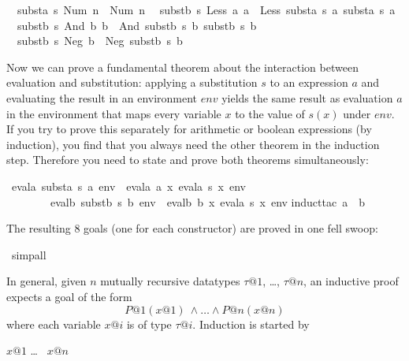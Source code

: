 \begin{isabellebody}
\ \ {\isachardoublequote}substa\ s\ {\isacharparenleft}Num\ n{\isacharparenright}\ {\isacharequal}\ Num\ n{\isachardoublequote}\isanewline
\isanewline
\ \ {\isachardoublequote}substb\ s\ {\isacharparenleft}Less\ a{}\ a{}{\isacharparenright}\ {\isacharequal}\ Less\ {\isacharparenleft}substa\ s\ a{}{\isacharparenright}\ {\isacharparenleft}substa\ s\ a{}{\isacharparenright}{\isachardoublequote}\isanewline
\ \ {\isachardoublequote}substb\ s\ {\isacharparenleft}And\ b{}\ b{}{\isacharparenright}\ {\isacharequal}\ And\ {\isacharparenleft}substb\ s\ b{}{\isacharparenright}\ {\isacharparenleft}substb\ s\ b{}{\isacharparenright}{\isachardoublequote}\isanewline
\ \ {\isachardoublequote}substb\ s\ {\isacharparenleft}Neg\ b{\isacharparenright}\ {\isacharequal}\ Neg\ {\isacharparenleft}substb\ s\ b{\isacharparenright}{\isachardoublequote}\isamarkupfalse%
%
\begin{isamarkuptext}%
Now we can prove a fundamental theorem about the interaction between
evaluation and substitution: applying a substitution $s$ to an expression $a$
and evaluating the result in an environment $env$ yields the same result as
evaluation $a$ in the environment that maps every variable $x$ to the value
of $s(x)$ under $env$. If you try to prove this separately for arithmetic or
boolean expressions (by induction), you find that you always need the other
theorem in the induction step. Therefore you need to state and prove both
theorems simultaneously:%
\end{isamarkuptext}%
\isamarkuptrue%
\ {\isachardoublequote}evala\ {\isacharparenleft}substa\ s\ a{\isacharparenright}\ env\ {\isacharequal}\ evala\ a\ {\isacharparenleft}{\isasymlambda}x{\isachardot}\ evala\ {\isacharparenleft}s\ x{\isacharparenright}\ env{\isacharparenright}\ {\isasymand}\isanewline
\ \ \ \ \ \ \ \ evalb\ {\isacharparenleft}substb\ s\ b{\isacharparenright}\ env\ {\isacharequal}\ evalb\ b\ {\isacharparenleft}{\isasymlambda}x{\isachardot}\ evala\ {\isacharparenleft}s\ x{\isacharparenright}\ env{\isacharparenright}{\isachardoublequote}\isanewline
\isamarkupfalse%
induct{\isacharunderscore}tac\ a\ \ b{\isacharparenright}\isamarkupfalse%
%
\begin{isamarkuptxt}%
\noindent
The resulting 8 goals (one for each constructor) are proved in one fell swoop:%
\end{isamarkuptxt}%
\isamarkuptrue%
\ simp{\isacharunderscore}all\isamarkupfalse%
\isamarkupfalse%
%
\begin{isamarkuptext}%
In general, given $n$ mutually recursive datatypes $\tau@1$, \dots, $\tau@n$,
an inductive proof expects a goal of the form
\[ P@1(x@1)\ \land \dots \land P@n(x@n) \]
where each variable $x@i$ is of type $\tau@i$. Induction is started by
\begin{isabelle}
 $x@1$  \dots\  $x@n$\isa{{\isacharparenright}}
\end{isabelle}


\end{isamarkuptext}
\end{isabellebody}
